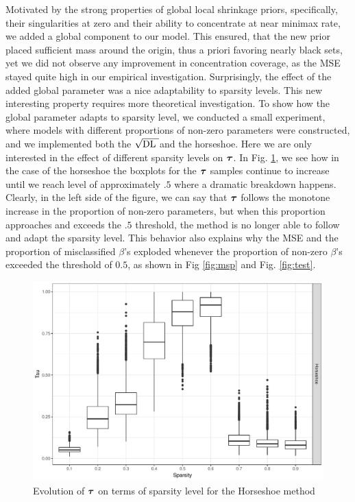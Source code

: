 \documentclass[chapters]{uamaththesis}
\def\sqdl{$\sqrt{\text{\rm{DL} }}$}
\begin{document}
Motivated by the strong properties of global local shrinkage priors, specifically, their singularities at zero and their ability to concentrate at near minimax rate, we added a global component to our model. This ensured, that the new prior placed sufficient mass around the origin, thus a priori favoring nearly black sets, yet we did not observe any improvement in concentration coverage, as the MSE stayed quite high in our empirical investigation. Surprisingly, the effect of the added global parameter was a nice adaptability to sparsity levels. This new interesting property requires more theoretical investigation. 
To show how the global parameter adapts to sparsity level, we conducted a small experiment, where models with different proportions of non-zero parameters were constructed, and we implemented both the \sqdl and the horseshoe. Here we are only interested in the effect of different sparsity levels on $\boldsymbol{\tau}$. In Fig. \ref{fig:tau-hs}, we see how in the case of the horseshoe the boxplots for the $\boldsymbol{\tau}$ samples continue to increase until we reach  level of approximately $.5$ where a dramatic breakdown happens. Clearly, in the left side of the figure, we can say that $\boldsymbol{\tau}$ follows the monotone increase in the proportion of non-zero parameters, but when this proportion approaches and exceeds the $.5$ threshold, the method is no longer able to follow and adapt the sparsity level. This behavior also explains why the MSE and the proportion of misclassified $\beta$'s exploded whenever the proportion of non-zero $\beta$'s exceeded the threshold of $0.5$, as shown in Fig \ref{fig:msp} and Fig. \ref{fig:test}.
\begin{figure}
\centering
\includegraphics[scale = .6]{Tau_hs}\caption{Evolution of $\boldsymbol{\tau}$ on terms of sparsity level for the Horseshoe method}\label{fig:tau-hs}
\end{figure}
\end{document}

